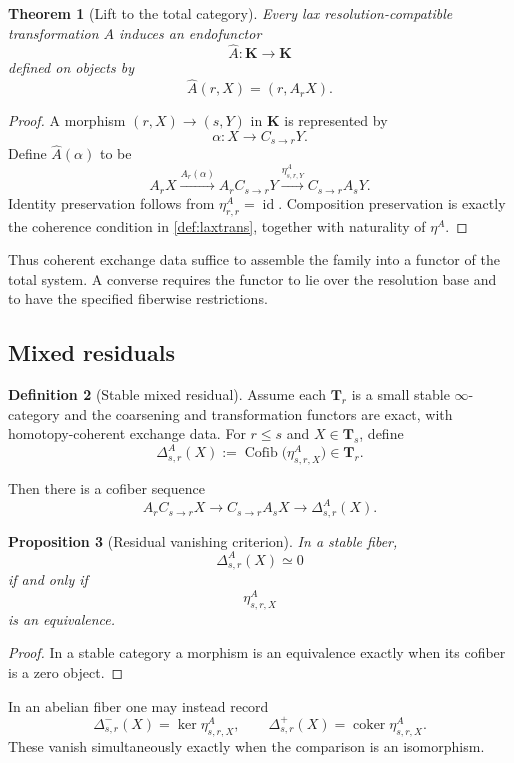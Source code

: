 \documentclass[11pt]{article}
\newtheorem{theorem}{Theorem}[section]
\newtheorem{proposition}[theorem]{Proposition}
\theoremstyle{definition}
\newtheorem{definition}[theorem]{Definition}
\theoremstyle{remark}
\newcommand{\K}{\mathbf K}
\newcommand{\Tcat}{\mathbf T}
\newcommand{\Cofib}{\operatorname{Cofib}}
\newcommand{\id}{\operatorname{id}}
\begin{document}
\begin{theorem}[Lift to the total category]\label{thm:lift-total}
Every lax resolution-compatible transformation $A$ induces an endofunctor
\[
\widehat A:\K\to\K
\]
defined on objects by
\[
\widehat A(r,X)=(r,A_rX).
\]
\end{theorem}

\begin{proof}
A morphism $(r,X)\to(s,Y)$ in $\K$ is represented by
\[
\alpha:X\to C_{s\to r}Y.
\]
Define $\widehat A(\alpha)$ to be
\[
A_rX
\xrightarrow{A_r(\alpha)}
A_rC_{s\to r}Y
\xrightarrow{\eta^A_{s,r,Y}}
C_{s\to r}A_sY.
\]
Identity preservation follows from $\eta^A_{r,r}=\id$. Composition preservation is exactly the coherence condition in \cref{def:laxtrans}, together with naturality of $\eta^A$.
\end{proof}

Thus coherent exchange data suffice to assemble the family into a functor of the total system. A converse requires the functor to lie over the resolution base and to have the specified fiberwise restrictions.

\subsection{Mixed residuals}

\begin{definition}[Stable mixed residual]
Assume each $\Tcat_r$ is a small stable $\infty$-category and the coarsening and transformation functors are exact, with homotopy-coherent exchange data. For $r\le s$ and $X\in\Tcat_s$, define
\[
\Delta^A_{s,r}(X)
:=
\Cofib\bigl(\eta^A_{s,r,X}\bigr)
\in\Tcat_r.
\]
\end{definition}

Then there is a cofiber sequence
\[
A_rC_{s\to r}X
\longrightarrow
C_{s\to r}A_sX
\longrightarrow
\Delta^A_{s,r}(X).
\]

\begin{proposition}[Residual vanishing criterion]\label{prop:residual-vanish}
In a stable fiber,
\[
\Delta^A_{s,r}(X)\simeq0
\]
if and only if
\[
\eta^A_{s,r,X}
\]
is an equivalence.
\end{proposition}

\begin{proof}
In a stable category a morphism is an equivalence exactly when its cofiber is a zero object.
\end{proof}

In an abelian fiber one may instead record
\[
\Delta^-_{s,r}(X)=\ker\eta^A_{s,r,X},
\qquad
\Delta^+_{s,r}(X)=\operatorname{coker}\eta^A_{s,r,X}.
\]
These vanish simultaneously exactly when the comparison is an isomorphism.
\end{document}
